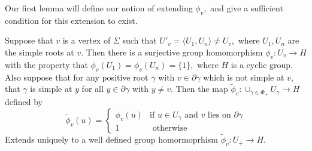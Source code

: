 \documentclass[class=book, crop=false,12 pt]{standalone}
\begin{document}
Our first lemma will define our notion of extending $\phi_v,$ and give a sufficient condition for this extension to exist.
\begin{lemma}
	\label{lem:existence}
	Suppose that $v$ is a vertex of $\Sigma$ such that $U'_v=\langle U_1,U_n\rangle\neq U_v,$ where $U_1,U_n$ are the simple roots at $v.$ Then there is a surjective group homomorphism $\phi_v:U_v\to H$ with the property that $\phi_v(U_1)=\phi_v(U_n)=\{1\},$ where $H$ is a cyclic group. Also suppose that for any positive root $\gamma$ with $v\in \partial \gamma$ which is not simple at $v,$ that $\gamma$ is simple at $y$ for all $y\in \partial \gamma$ with $y\neq v.$ Then the map $\tilde{\phi}_v:\cup_{\gamma\in \Phi_+}U_\gamma\to H$ defined by
\[
	\tilde{\phi}_v(u)=\begin{cases} \phi_v(u)&\text{if }u\in U_\gamma\text{ and }v\text{ lies on }\partial\gamma\\
		1&\text{ otherwise}
	\end{cases}
\]
Extends uniquely to a well defined group homormoprhism $\tilde{\phi}_v:U_+\to H.$
\end{lemma}
\end{document}
